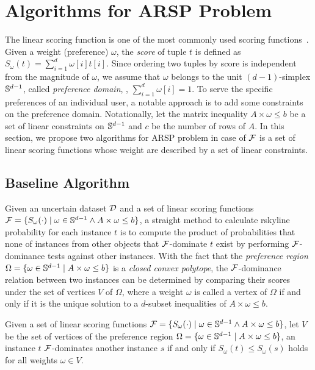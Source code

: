\section{Algorithms for ARSP Problem}\label{sec:rskyprobalg}

The linear scoring function is one of the most commonly used scoring functions~\cite{DBLP:journals/ior/DyerS79}.
Given a weight (preference) $\omega$, the \textit{score} of tuple $t$ is defined as $S_\omega(t) = \sum^d_{i = 1} \omega[i]t[i]$.
Since ordering two tuples by score is independent from the magnitude of $\omega$, we assume that $\omega$ belongs to the unit $(d-1)$-simplex $\mathbb{S}^{d-1}$, called \textit{preference domain}, \ie, $\sum^d_{i = 1} \omega[i] = 1$.
To serve the specific preferences of an individual user, a notable approach is to add some constraints on the preference domain.
Notationally, let the matrix inequality $A \times \omega \le b$ be a set of linear constraints on $\mathbb{S}^{d-1}$ and $c$ be the number of rows of $A$.
In this section, we propose two algorithms for ARSP problem in case of $\mathcal{F}$ is a set of linear scoring functions whose weight are described by a set of linear constraints.

\subsection{Baseline Algorithm}\label{subsec:bsl}

Given an uncertain dataset $\mathcal{D}$ and a set of linear scoring functions $\mathcal{F} = \{S_\omega(\cdot) \mid \omega \in \mathbb{S}^{d-1} \wedge A \times \omega \le b\}$, a straight method to calculate rskyline probability for each instance $t$ is to compute the product of probabilities that none of instances from other objects that $\mathcal{F}$-dominate $t$ exist by performing $\mathcal{F}$-dominance tests against other instances.
With the fact that the \textit{preference region} $\Omega = \{\omega \in \mathbb{S}^{d-1} \mid A \times \omega \le b\}$ is a \textit{closed convex polytope}, the $\mathcal{F}$-dominance relation between two instances can be determined by comparing their scores under the set of vertices $V$ of $\Omega$, where a weight $\omega$ is called a vertex of $\Omega$ if and only if it is the unique solution to a $d$-subset inequalities of $A \times \omega \le b$.

\begin{theorem}
	Given a set of linear scoring functions $\mathcal{F} = \{S_\omega(\cdot) \mid \omega \in \mathbb{S}^{d-1} \wedge A \times \omega \le b\}$, let $V$ be the set of vertices of the preference region $\Omega = \{\omega \in \mathbb{S}^{d-1} \mid A \times \omega \le b\}$, an instance $t$ $\mathcal{F}$-dominates another instance $s$ if and only if $S_\omega(t) \le S_\omega(s)$ holds for all weights $\omega \in V$.
	\label{thm:F-dominace-V}
\end{theorem}

